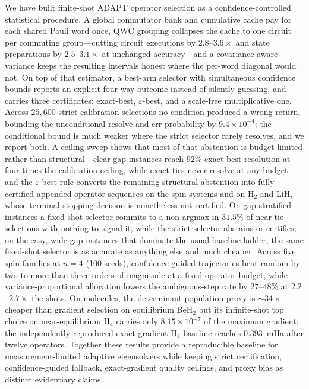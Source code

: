 \documentclass[aps,pra,reprint,superscriptaddress,nofootinbib,floatfix]{revtex4-2}
\begin{document}
We have built finite-shot ADAPT operator selection as a confidence-controlled statistical procedure. A global commutator bank and cumulative cache pay for each shared Pauli word once, QWC grouping collapses the cache to one circuit per commuting group---cutting circuit executions by $2.8$--$3.6\times$ and state preparations by $2.5$--$3.1\times$ at unchanged accuracy---and a covariance-aware variance keeps the resulting intervals honest where the per-word diagonal would not. On top of that estimator, a best-arm selector with simultaneous confidence bounds reports an explicit four-way outcome instead of silently guessing, and carries three certificates: exact-best, $\varepsilon$-best, and a scale-free multiplicative one. Across $25{,}600$ strict calibration selections no condition produced a wrong return, bounding the unconditional resolve-and-err probability by $9.4\times10^{-4}$; the conditional bound is much weaker where the strict selector rarely resolves, and we report both. A ceiling sweep shows that most of that abstention is budget-limited rather than structural---clear-gap instances reach $92\%$ exact-best resolution at four times the calibration ceiling, while exact ties never resolve at any budget---and the $\varepsilon$-best rule converts the remaining structural abstention into fully certified appended-operator sequences on the spin systems and on H$_2$ and LiH, whose terminal stopping decision is nonetheless not certified. On gap-stratified instances a fixed-shot selector commits to a non-argmax in $31.5\%$ of near-tie selections with nothing to signal it, while the strict selector abstains or certifies; on the easy, wide-gap instances that dominate the usual baseline ladder, the same fixed-shot selector is as accurate as anything else and much cheaper. Across five spin families at $n=4$ (100 seeds), confidence-guided trajectories beat random by two to more than three orders of magnitude at a fixed operator budget, while variance-proportional allocation lowers the ambiguous-step rate by $27$--$48\%$ at $2.2$--$2.7\times$ the shots. On molecules, the determinant-population proxy is $\sim\!34\times$ cheaper than gradient selection on equilibrium BeH$_2$ but its infinite-shot top choice on near-equilibrium H$_4$ carries only $8.15\times10^{-7}$ of the maximum gradient; the independently reproduced exact-gradient H$_4$ baseline reaches $0.393$~mHa after twelve operators. Together these results provide a reproducible baseline for measurement-limited adaptive eigensolvers while keeping strict certification, confidence-guided fallback, exact-gradient quality ceilings, and proxy bias as distinct evidentiary claims.
\end{document}
